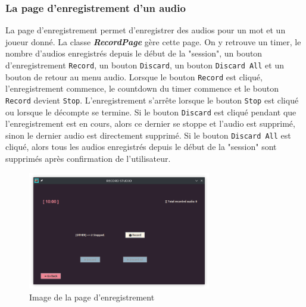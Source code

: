 \subsubsection*{La page d'enregistrement d'un audio}
\label{subsubsec:sonVueEnregistrementAudio}

La page d'enregistrement permet d'enregistrer des audios pour un mot et un joueur
donné. La classe \textbf{\textit{RecordPage}} gère cette page. On y retrouve un
timer, le nombre d'audios enregistrés depuis le début de la "session", un bouton
d'enregistrement \texttt{Record}, un bouton \texttt{Discard}, un bouton
\texttt{Discard All} et un bouton de retour au menu audio.
Lorsque le bouton \texttt{Record} est cliqué, l'enregistrement commence, le countdown
du timer commence et le bouton \texttt{Record} devient \texttt{Stop}. L'enregistrement
s'arrête lorsque le bouton \texttt{Stop} est cliqué ou lorsque le décompte se termine.
Si le bouton \texttt{Discard} est cliqué pendant que l'enregistrement est en cours,
alors ce dernier se stoppe et l'audio est supprimé, sinon le dernier audio est
directement supprimé.
Si le bouton \texttt{Discard All} est cliqué, alors tous les audios enregistrés
depuis le début de la "session" sont supprimés après confirmation de l'utilisateur.

\begin{figure}[!htb]
    \centering
    \includegraphics[width=8cm]{ressources/Implementation/Son/RecordPage.png}%
    \caption{Image de la page d'enregistrement}
    \label{fig:RecordPage}
\end{figure}
